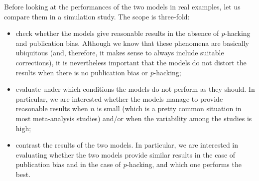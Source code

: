 \documentclass[preprint, authoryear]{elsarticle}
\theoremstyle{plain}
\theoremstyle{definition}
\begin{document}
%
%
Before looking at the performances of the two models in real examples, let us compare them in a simulation study. The scope is three-fold:
\begin{itemize}
\item check whether the models give reasonable results in the absence of \emph{p}-hacking and publication bias. Although we know that these phenomena are basically ubiquitous (and, therefore, it makes sense to always include suitable corrections), it is nevertheless important that the models do not distort the results when there is no publication bias or \emph{p}-hacking;
\item evaluate under which conditions the models do not perform as they should. In particular, we are interested whether the models manage to provide reasonable results when $n$ is small (which is a pretty common situation in most meta-analysis studies) and/or when the variability among the studies is high;
\item contrast the results of the two models. In particular, we are interested in evaluating whether the two models provide similar results in the case of publication bias and in the case of \emph{p}-hacking, and which one performs the best.
\end{itemize}
\end{document}
